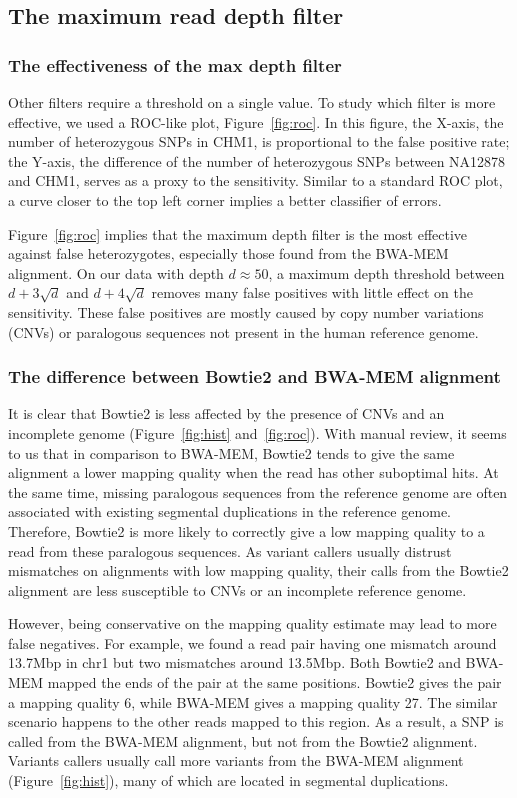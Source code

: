 \documentclass{bioinfo-ori}
\begin{document}
\subsection{The maximum read depth filter}

\subsubsection{The effectiveness of the max depth filter}
Other filters require a threshold on a single value. To study
which filter is more effective, we used a ROC-like plot,
Figure~\ref{fig:roc}. In this figure, the X-axis, the number of heterozygous
SNPs in CHM1, is proportional to the false positive rate; the Y-axis, the
difference of the number of heterozygous SNPs between NA12878 and CHM1, serves
as a proxy to the sensitivity. Similar to a standard ROC plot, a curve closer
to the top left corner implies a better classifier of errors.

Figure~\ref{fig:roc} implies that the maximum depth filter is the most
effective against false heterozygotes, especially those found from the BWA-MEM
alignment. On our data with depth $d\approx50$, a maximum depth threshold
between $d+3\sqrt{d}$ and $d+4\sqrt{d}$ removes many false positives with
little effect on the sensitivity. These false positives are mostly caused by
copy number variations (CNVs) or paralogous sequences not present in the human
reference genome.

\subsubsection{The difference between Bowtie2 and BWA-MEM alignment}
It is clear that Bowtie2 is less affected by the presence of CNVs and an
incomplete genome (Figure~\ref{fig:hist} and~\ref{fig:roc}). With manual
review, it seems to us that in comparison to BWA-MEM, Bowtie2 tends to give the
same alignment a lower mapping quality when the read has other suboptimal hits.
At the same time, missing paralogous sequences from the reference genome are
often associated with existing segmental duplications in the reference genome.
Therefore, Bowtie2 is more likely to correctly give a low mapping quality to a
read from these paralogous sequences. As variant callers usually distrust
mismatches on alignments with low mapping quality, their calls from the Bowtie2
alignment are less susceptible to CNVs or an incomplete reference genome.

However, being conservative on the mapping quality estimate may lead to more false
negatives. For example, we found a read pair having one mismatch around
13.7Mbp in chr1 but two mismatches around 13.5Mbp. Both Bowtie2 and BWA-MEM
mapped the ends of the pair at the same positions. Bowtie2 gives the pair a
mapping quality 6, while BWA-MEM gives a mapping quality 27. The similar
scenario happens to the other reads mapped to this region. As a result, a SNP
is called from the BWA-MEM alignment, but not from the Bowtie2 alignment.
Variants callers usually call more variants from the BWA-MEM alignment
(Figure~\ref{fig:hist}), many of which are located in segmental duplications.
\end{document}
